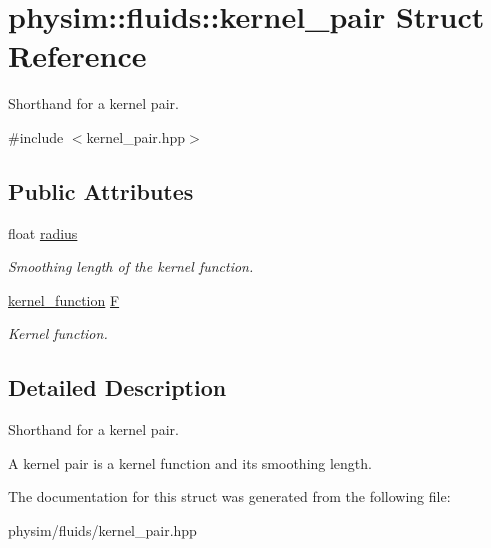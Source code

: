 \hypertarget{structphysim_1_1fluids_1_1kernel__pair}{}\section{physim\+:\+:fluids\+:\+:kernel\+\_\+pair Struct Reference}
\label{structphysim_1_1fluids_1_1kernel__pair}


Shorthand for a kernel pair.  




{\ttfamily \#include $<$kernel\+\_\+pair.\+hpp$>$}

\subsection*{Public Attributes}
\begin{DoxyCompactItemize}
\item 
\mbox{\label{structphysim_1_1fluids_1_1kernel__pair_a44fa73fce71ecf96844b9466ec6f65b8}} 
float \hyperlink{structphysim_1_1fluids_1_1kernel__pair_a44fa73fce71ecf96844b9466ec6f65b8}{radius}
\begin{DoxyCompactList}\small\item\em Smoothing length of the kernel function. \end{DoxyCompactList}\item 
\mbox{\label{structphysim_1_1fluids_1_1kernel__pair_aaabaa1f7a947d4c3f1ecb3935a6be4fd}} 
\hyperlink{namespacephysim_1_1fluids_a9ae48412f63ffbfff48be326dc9170f4}{kernel\+\_\+function} \hyperlink{structphysim_1_1fluids_1_1kernel__pair_aaabaa1f7a947d4c3f1ecb3935a6be4fd}{F}
\begin{DoxyCompactList}\small\item\em Kernel function. \end{DoxyCompactList}\end{DoxyCompactItemize}


\subsection{Detailed Description}
Shorthand for a kernel pair. 

A kernel pair is a kernel function and its smoothing length. 

The documentation for this struct was generated from the following file\+:\begin{DoxyCompactItemize}
\item 
physim/fluids/kernel\+\_\+pair.\+hpp\end{DoxyCompactItemize}
